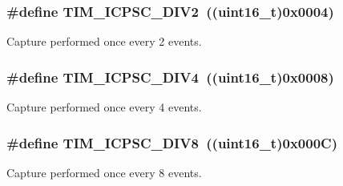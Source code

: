 \subsubsection[{T\+I\+M\+\_\+\+I\+C\+P\+S\+C\+\_\+\+D\+I\+V2}]{\setlength{\rightskip}{0pt plus 5cm}\#define T\+I\+M\+\_\+\+I\+C\+P\+S\+C\+\_\+\+D\+I\+V2~((uint16\+\_\+t)0x0004)}\label{group___t_i_m___input___capture___prescaler_ga1d8a7b66add914e2ddd910d2d700978f}
Capture performed once every 2 events. \hypertarget{group___t_i_m___input___capture___prescaler_gaf5a675046430fa0f0c95b0dac612828f}{}
\subsubsection[{T\+I\+M\+\_\+\+I\+C\+P\+S\+C\+\_\+\+D\+I\+V4}]{\setlength{\rightskip}{0pt plus 5cm}\#define T\+I\+M\+\_\+\+I\+C\+P\+S\+C\+\_\+\+D\+I\+V4~((uint16\+\_\+t)0x0008)}\label{group___t_i_m___input___capture___prescaler_gaf5a675046430fa0f0c95b0dac612828f}
Capture performed once every 4 events. \hypertarget{group___t_i_m___input___capture___prescaler_ga5086cb03c89a5c67b199d20b605f00cb}{}
\subsubsection[{T\+I\+M\+\_\+\+I\+C\+P\+S\+C\+\_\+\+D\+I\+V8}]{\setlength{\rightskip}{0pt plus 5cm}\#define T\+I\+M\+\_\+\+I\+C\+P\+S\+C\+\_\+\+D\+I\+V8~((uint16\+\_\+t)0x000\+C)}\label{group___t_i_m___input___capture___prescaler_ga5086cb03c89a5c67b199d20b605f00cb}
Capture performed once every 8 events. 